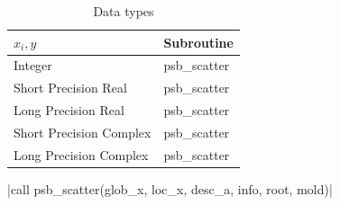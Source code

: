 \begin{table}[h]
\begin{center}
\begin{tabular}{ll}
\hline
$x_i, y$ & {\bf Subroutine}\\
\hline
Integer          & psb\_scatter \\
Short Precision Real & psb\_scatter \\
Long Precision Real & psb\_scatter \\
Short Precision Complex & psb\_scatter \\
Long Precision Complex & psb\_scatter \\
\hline
\end{tabular}
\end{center}
\caption{Data types\label{tab:scatter}}
\end{table}

\fortinline|call psb_scatter(glob_x, loc_x, desc_a, info, root, mold)|


